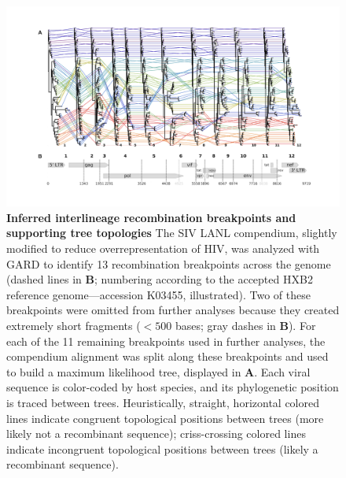 \begin{figure}[ht!]
  \begin{centering}
    \includegraphics[width=\linewidth]{./png/siv_recombination.png}
  	\caption[Inferred interlineage recombination breakpoints and supporting tree topologies]{\textbf{Inferred interlineage recombination breakpoints and supporting tree topologies }
The SIV LANL compendium, slightly modified to reduce overrepresentation of HIV, was analyzed with GARD to identify 13 recombination breakpoints across the genome (dashed lines in \textbf{B}; numbering according to the accepted HXB2 reference genome---accession K03455, illustrated).
Two of these breakpoints were omitted from further analyses because they created extremely short fragments ($<500$ bases; gray dashes in \textbf{B}).
For each of the 11 remaining breakpoints used in further analyses, the compendium alignment was split along these breakpoints and used to build a maximum likelihood tree, displayed in \textbf{A}.
Each viral sequence is color-coded by host species, and its phylogenetic position is traced between trees.
Heuristically, straight, horizontal colored lines indicate congruent topological positions between trees (more likely not a recombinant sequence); criss-crossing colored lines indicate incongruent topological positions between trees (likely a recombinant sequence).
}
  	\label{siv_recombination}
  \end{centering}
\end{figure}

